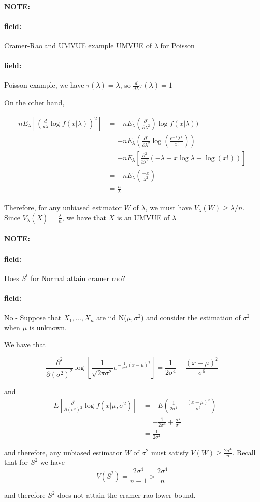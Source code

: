 \documentclass[12pt]{article}
\newenvironment{note}{\paragraph{NOTE:}}{}
\newenvironment{field}{\paragraph{field:}}{}
\begin{document}
\begin{note}
  \begin{field}
    Cramer-Rao and UMVUE example
    UMVUE of $\lambda$ for Poisson
  \end{field}
  \begin{field}
    Poisson example, we have $\tau(\lambda) = \lambda$, so $\frac{d}{d\lambda}\tau(\lambda) = 1$

    On the other hand,

    \begin{align*}
      nE_\lambda[(\frac{d}{d\lambda}\log f(x|\lambda))^2] &= -n E_\lambda(\frac{\partial ^2 }{\partial \lambda ^2}) \log f(x|\lambda))\\
      &= -n E_\lambda(\frac{\partial ^2 }{\partial \lambda ^2} \log (\frac{e^{-\lambda}\lambda^x}{x!}))\\
      &= -n E_\lambda[\frac{\partial ^2 }{\partial \lambda ^2}(-\lambda + x \log \lambda - \log(x!))]\\
      &= -n E_\lambda(\frac{-x}{\lambda^2})\\
      &= \frac{n}{\lambda}
    \end{align*}

    Therefore, for any unbiased estimator $W$ of $\lambda$, we must have $V_\lambda(W) \geq \lambda /n$. Since $V_\lambda(\bar{X}) = \frac{\lambda}{n}$, we have that $\bar{X}$ is an UMVUE of $\lambda$
  \end{field}
\end{note}

\begin{note}
  \begin{field}
    Does $S^t$ for Normal attain cramer rao?
  \end{field}
  \begin{field}
    No -
    Suppose that $X_1, \ldots , X_n$ are iid N($\mu,\sigma^2$)
    and consider the estimation of $\sigma^2$ when $\mu$ is unknown.

    We have that

    $$ \frac{\partial ^2 }{\partial (\sigma^2) ^2} \log [ \frac{1}{\sqrt{2\pi\sigma^2}} e^{-\frac{1}{2\sigma^2}(x-\mu)^2}] = \frac{1}{2\sigma^4} - \frac{(x-\mu)^2}{\sigma^6}$$

    and
    \begin{align*}
      -E[\frac{\partial ^2 }{\partial (\sigma^2)^2 } \log f(x|\mu,\sigma^2)] &= -E(\frac{1}{2\sigma^4} - \frac{(x-\mu)^2}{\sigma^6})\\
      &= -\frac{1}{2\sigma^4} + \frac{\sigma^2}{\sigma^6}\\
      &= \frac{1}{2\sigma^4}
    \end{align*}

    and therefore, any unbiased estimator $W$ of $\sigma^2$ must satisfy $V(W) \geq \frac{2\sigma^4}{n}$. Recall that for $S^2$ we have $$V(S^2) = \frac{2\sigma^4}{n-1} > \frac{2\sigma^4}{n}$$

    and therefore $S^2$ does not attain the cramer-rao lower bound.

  \end{field}
\end{note}
\end{document}
